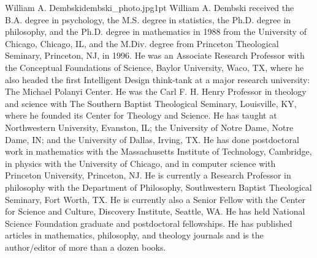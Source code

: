 \begin{authorbio}{William A. Dembski}{dembski_photo.jpg}{1pt}
William A. Dembski received the B.A. degree in psychology, the M.S. degree in statistics, the
Ph.D. degree in philosophy, and the Ph.D. degree in mathematics in 1988 from the University of
Chicago, Chicago, IL, and the M.Div. degree from Princeton Theological Seminary, Princeton,
NJ, in 1996. He was an Associate Research Professor with the Conceptual Foundations of Science, 
Baylor University, Waco, TX, where he also headed the first Intelligent Design think-tank
at a major research university: The Michael Polanyi Center. He was the Carl F. H. Henry Professor 
in theology and science with The Southern Baptist Theological Seminary, Louisville, KY,
where he founded its Center for Theology and Science. He has taught at Northwestern University, 
Evanston, IL; the University of Notre Dame, Notre Dame, IN; and the University of Dallas,
Irving, TX. He has done postdoctoral work in mathematics with the Massachusetts Institute of
Technology, Cambridge, in physics with the University of Chicago, and in computer science with
Princeton University, Princeton, NJ.  %
He is currently a
Research Professor in philosophy with the Department of Philosophy, Southwestern Baptist Theological 
Seminary, Fort Worth, TX. He is currently also a Senior Fellow with the Center for Science
and Culture, Discovery Institute, Seattle, WA. He has held National Science Foundation graduate
and postdoctoral fellowships. He has published articles in mathematics, philosophy, and theology
journals and is the author/editor of more than a dozen books. 
\end{authorbio}


